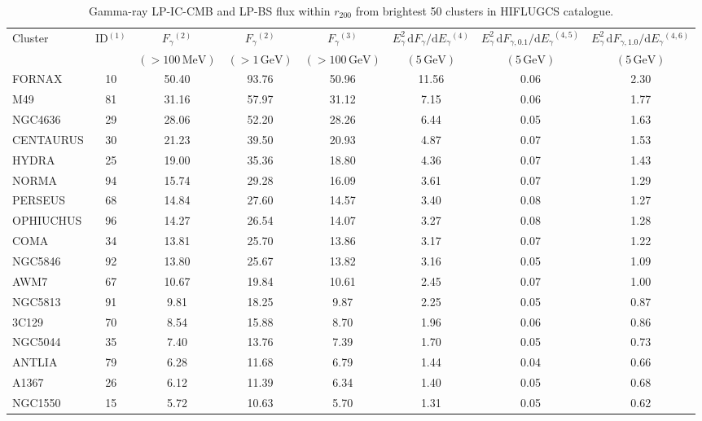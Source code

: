 \documentclass[10pt,aps,pra,reprint,amsmath,amsfonts,amssymb,showpacs,nofootinbib,floatfix]{revtex4-1}
\newcommand{\rmn}{\mathrm}
\newcommand{\dd}{\rmn{d}}
\newcommand{\rvir}{r_{200}}
\newcommand{\eg}{E_\gamma}
\begin{document}
\begin{table}
\begin{minipage}{2.0\columnwidth}
  \caption{Gamma-ray LP-IC-CMB and LP-BS flux within $\rvir$ from brightest 50 clusters in HIFLUGCS catalogue.}
\begin{tabular}{l  c c c c c c c}
\hline
\hline
 Cluster & ID$^{(1)}$ & $F_{\gamma}$$^{(2)}$ & $F_{\gamma}$$^{(2)}$& 
 $F_{\gamma}$$^{(3)}$ & $\eg^2\,\dd F_{\gamma}/\dd \eg$$^{(4)}$ &
 $\eg^2\,\dd F_{\gamma,0.1}/\dd \eg$$^{(4,5)}$ & 
 $\eg^2\,\dd F_{\gamma,1.0}/\dd \eg$$^{(4,6)}$\\
  & & $(>100\,\rmn{MeV})$ & $(>1\,\rmn{GeV})$ & $(>100\,\rmn{GeV})$ & 
 $(5\,\rmn{GeV})$ & $(5\,\rmn{GeV})$ &  $(5\,\rmn{GeV})$\\
 \hline
FORNAX   &  10 &  50.40 &  93.76 &  50.96 &  11.56 &   0.06 &   2.30 \\
M49      &  81 &  31.16 &  57.97 &  31.12 &   7.15 &   0.06 &   1.77 \\
NGC4636  &  29 &  28.06 &  52.20 &  28.26 &   6.44 &   0.05 &   1.63 \\
CENTAURUS &  30 &  21.23 &  39.50 &  20.93 &   4.87 &   0.07 &   1.53 \\
HYDRA    &  25 &  19.00 &  35.36 &  18.80 &   4.36 &   0.07 &   1.43 \\
NORMA    &  94 &  15.74 &  29.28 &  16.09 &   3.61 &   0.07 &   1.29 \\
PERSEUS  &  68 &  14.84 &  27.60 &  14.57 &   3.40 &   0.08 &   1.27 \\
OPHIUCHUS &  96 &  14.27 &  26.54 &  14.07 &   3.27 &   0.08 &   1.28 \\
COMA     &  34 &  13.81 &  25.70 &  13.86 &   3.17 &   0.07 &   1.22 \\
NGC5846  &  92 &  13.80 &  25.67 &  13.82 &   3.16 &   0.05 &   1.09 \\
AWM7     &  67 &  10.67 &  19.84 &  10.61 &   2.45 &   0.07 &   1.00 \\
NGC5813  &  91 &   9.81 &  18.25 &   9.87 &   2.25 &   0.05 &   0.87 \\
3C129    &  70 &   8.54 &  15.88 &   8.70 &   1.96 &   0.06 &   0.86 \\
NGC5044  &  35 &   7.40 &  13.76 &   7.39 &   1.70 &   0.05 &   0.73 \\
ANTLIA   &  79 &   6.28 &  11.68 &   6.79 &   1.44 &   0.04 &   0.66 \\
A1367    &  26 &   6.12 &  11.39 &   6.34 &   1.40 &   0.05 &   0.68 \\
NGC1550  &  15 &   5.72 &  10.63 &   5.70 &   1.31 &   0.05 &   0.62 \\

\end{tabular}
\end{minipage}
\end{table}
\end{document}
